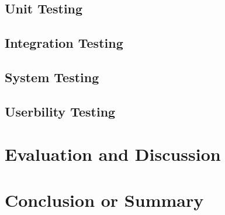 \documentclass[11pt]{cmpreport}
\begin{document}
\subsection{Unit Testing}

\subsection{Integration Testing}

\subsection{System Testing}

\subsection{Userbility Testing}


\section{Evaluation and Discussion}

\section{Conclusion or Summary}


%
 
\end{document}
